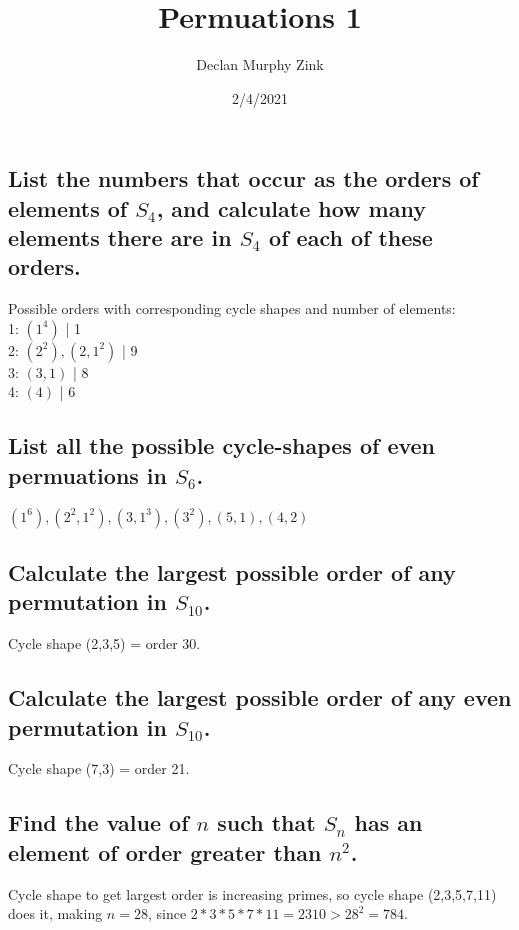 \documentclass[12pt]{article}
\begin{document}
\title{Permuations 1}
\author{Declan Murphy Zink}
\date{2/4/2021}
\maketitle

\setcounter{section}{2}

\section{}
\subsection{List the numbers that occur as the orders of elements of $S_4$, and calculate how many elements there are in $S_4$ of each of these orders.}
Possible orders with corresponding cycle shapes and number of elements:\\
1: $(1^4)$ | 1\\
2: $(2^2), (2,1^2)$ | 9\\
3: $(3,1)$ | 8\\
4: $(4)$ | 6

\subsection{List all the possible cycle-shapes of even permuations in $S_6$.}
$(1^6), (2^2,1^2), (3,1^3), (3^2), (5,1), (4,2)$

\subsection{Calculate the largest possible order of any permutation in $S_{10}$.}
Cycle shape (2,3,5) = order 30.

\subsection{Calculate the largest possible order of any even permutation in $S_{10}$.}
Cycle shape (7,3) = order 21.

\subsection{Find the value of $n$ such that $S_n$ has an element of order greater than $n^2$.}
Cycle shape to get largest order is increasing primes, so cycle shape (2,3,5,7,11) does it, making $n=28$, since $2*3*5*7*11 = 2310 > 28^2 = 784$.

\setcounter{section}{4}
\end{document}
